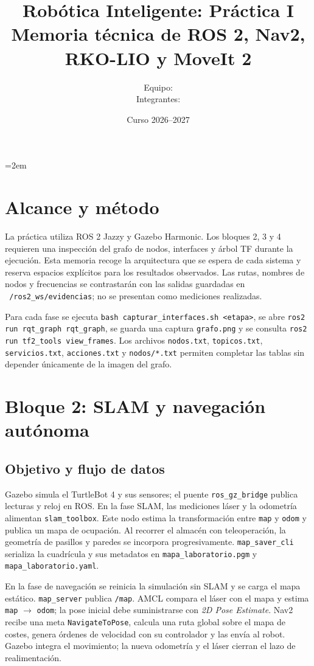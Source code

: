\documentclass[11pt,a4paper]{article}
\title{Robótica Inteligente: Práctica I\\\large Memoria técnica de ROS 2, Nav2, RKO-LIO y MoveIt 2}
\author{Equipo: \underline{\hspace{7cm}}\\ Integrantes: \underline{\hspace{6.3cm}}}
\date{Curso 2026--2027}
\newcommand{\ruta}{\texttt{~/ros2\_ws}}
\begin{document}
\emergencystretch=2em
\maketitle
\tableofcontents
\newpage

\section{Alcance y método}
La práctica utiliza ROS 2 Jazzy y Gazebo Harmonic. Los bloques 2, 3 y 4 requieren una inspección del grafo de nodos, interfaces y árbol TF durante la ejecución. Esta memoria recoge la arquitectura que se espera de cada sistema y reserva espacios explícitos para los resultados observados. Las rutas, nombres de nodos y frecuencias se contrastarán con las salidas guardadas en \ruta\texttt{/evidencias}; no se presentan como mediciones realizadas.

Para cada fase se ejecuta \texttt{bash capturar\_interfaces.sh <etapa>}, se abre \texttt{ros2 run rqt\_graph rqt\_graph}, se guarda una captura \texttt{grafo.png} y se consulta \texttt{ros2 run tf2\_tools view\_frames}. Los archivos \texttt{nodos.txt}, \texttt{topicos.txt}, \texttt{servicios.txt}, \texttt{acciones.txt} y \texttt{nodos/*.txt} permiten completar las tablas sin depender únicamente de la imagen del grafo.

\section{Bloque 2: SLAM y navegación autónoma}
\subsection{Objetivo y flujo de datos}
Gazebo simula el TurtleBot 4 y sus sensores; el puente \texttt{ros\_gz\_bridge} publica lecturas y reloj en ROS. En la fase SLAM, las mediciones láser y la odometría alimentan \texttt{slam\_toolbox}. Este nodo estima la transformación entre \texttt{map} y \texttt{odom} y publica un mapa de ocupación. Al recorrer el almacén con teleoperación, la geometría de pasillos y paredes se incorpora progresivamente. \texttt{map\_saver\_cli} serializa la cuadrícula y sus metadatos en \texttt{mapa\_laboratorio.pgm} y \texttt{mapa\_laboratorio.yaml}.

En la fase de navegación se reinicia la simulación sin SLAM y se carga el mapa estático. \texttt{map\_server} publica \texttt{/map}. AMCL compara el láser con el mapa y estima \texttt{map} $\rightarrow$ \texttt{odom}; la pose inicial debe suministrarse con \emph{2D Pose Estimate}. Nav2 recibe una meta \texttt{NavigateToPose}, calcula una ruta global sobre el mapa de costes, genera órdenes de velocidad con su controlador y las envía al robot. Gazebo integra el movimiento; la nueva odometría y el láser cierran el lazo de realimentación.
\end{document}
